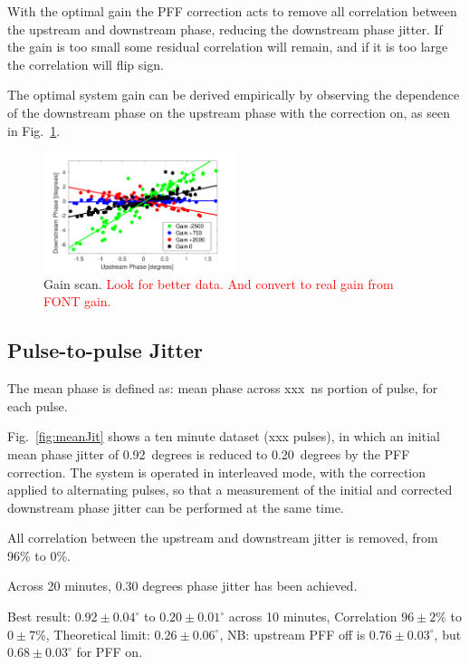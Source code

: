\documentclass[%
 reprint,
 amsmath,amssymb,
 aps,
]{revtex4-1}
\begin{document}
With the optimal gain the PFF correction acts to remove all correlation between 
the upstream and downstream phase, reducing the downstream phase jitter. If the 
gain is too small some residual correlation will remain, and if it is too large 
the correlation will flip sign. 

The optimal system gain can be derived empirically by observing the dependence 
of the downstream phase on the upstream phase with the correction on, as seen 
in Fig.~\ref{fig:gScan}.

\begin{figure}
\includegraphics[width=0.5\textwidth]{figs/gScan}%
\caption{\label{fig:gScan}Gain scan. \textcolor{red}{Look for better data. 
And convert to real gain from FONT gain.}}
\end{figure}


\subsection{\label{ss:meanJit}Pulse-to-pulse Jitter}

The mean phase is defined as: mean phase across xxx~ns portion of pulse, for 
each pulse.

Fig.~\ref{fig:meanJit} shows a ten minute dataset (xxx pulses), in which an 
initial mean phase jitter of 0.92~degrees is reduced to 0.20~degrees by the PFF 
correction. The system is operated in interleaved mode, with the correction 
applied to alternating pulses, so that a measurement of the initial and 
corrected downstream phase jitter can be performed at the same time.

All correlation between the upstream and downstream jitter is removed, from 
96\% to 0\%. 

Across 20 minutes, 0.30 degrees phase jitter has been achieved.

Best result:
\(0.92\pm0.04^\circ\) to \(0.20\pm0.01^\circ\)  across 10 minutes,
Correlation \(96\pm2\%\) to \(0\pm7\%\),
Theoretical limit: \(0.26\pm0.06^\circ\),
NB: upstream PFF off is \(0.76\pm0.03^\circ\), but \(0.68\pm0.03^\circ\) for 
PFF on.
\end{document}
